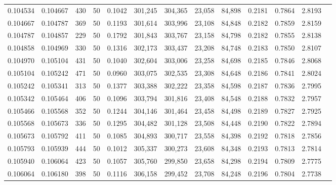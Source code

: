 \begin{tabular}{rrrrrrrrrrrrr}
0.104534 & 0.104667 &   430 &  50 &                                     0.1042 & 301,245 & 304,365 &  23,058 &  84,898 & 0.2181 & 0.7864 & 2.8193 \\
0.104667 & 0.104787 &   369 &  50 &                                     0.1193 & 301,614 & 303,996 &  23,108 &  84,848 & 0.2182 & 0.7859 & 2.8159 \\
0.104787 & 0.104857 &   229 &  50 &                                     0.1792 & 301,843 & 303,767 &  23,158 &  84,798 & 0.2182 & 0.7855 & 2.8138 \\
0.104858 & 0.104969 &   330 &  50 &                                     0.1316 & 302,173 & 303,437 &  23,208 &  84,748 & 0.2183 & 0.7850 & 2.8107 \\
0.104970 & 0.105104 &   431 &  50 &                                     0.1040 & 302,604 & 303,006 &  23,258 &  84,698 & 0.2185 & 0.7846 & 2.8068 \\
0.105104 & 0.105242 &   471 &  50 &                                     0.0960 & 303,075 & 302,535 &  23,308 &  84,648 & 0.2186 & 0.7841 & 2.8024 \\
0.105242 & 0.105341 &   313 &  50 &                                     0.1377 & 303,388 & 302,222 &  23,358 &  84,598 & 0.2187 & 0.7836 & 2.7995 \\
0.105342 & 0.105464 &   406 &  50 &                                     0.1096 & 303,794 & 301,816 &  23,408 &  84,548 & 0.2188 & 0.7832 & 2.7957 \\
0.105466 & 0.105568 &   352 &  50 &                                     0.1244 & 304,146 & 301,464 &  23,458 &  84,498 & 0.2189 & 0.7827 & 2.7925 \\
0.105568 & 0.105673 &   336 &  50 &                                     0.1295 & 304,482 & 301,128 &  23,508 &  84,448 & 0.2190 & 0.7822 & 2.7894 \\
0.105673 & 0.105792 &   411 &  50 &                                     0.1085 & 304,893 & 300,717 &  23,558 &  84,398 & 0.2192 & 0.7818 & 2.7856 \\
0.105793 & 0.105939 &   444 &  50 &                                     0.1012 & 305,337 & 300,273 &  23,608 &  84,348 & 0.2193 & 0.7813 & 2.7814 \\
0.105940 & 0.106064 &   423 &  50 &                                     0.1057 & 305,760 & 299,850 &  23,658 &  84,298 & 0.2194 & 0.7809 & 2.7775 \\
0.106064 & 0.106180 &   398 &  50 &                                     0.1116 & 306,158 & 299,452 &  23,708 &  84,248 & 0.2196 & 0.7804 & 2.7738 \\

\end{tabular}
